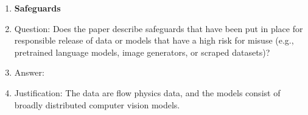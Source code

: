 \documentclass{article}
\begin{document}
\begin{enumerate}
\item {\bf Safeguards}
    \item[] Question: Does the paper describe safeguards that have been put in place for responsible release of data or models that have a high risk for misuse (e.g., pretrained language models, image generators, or scraped datasets)?
    \item[] Answer: \answerNA{} %
    \item[] Justification: The data are flow physics data, and the models consist of broadly distributed computer vision models.


\end{enumerate}
\end{document}
